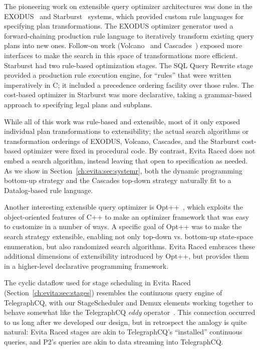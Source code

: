 The pioneering work on extensible query optimizer architectures was done in the
EXODUS~\cite{exodus} and Starburst~\cite{lohman,phh92} systems, which provided
custom rule languages for specifying plan transformations.  The EXODUS
optimizer generator used a forward-chaining production rule language to iteratively
transform existing query plans into new ones.  Follow-on work
(Volcano~\cite{volcano} and Cascades~\cite{cascades}) exposed more interfaces
to make the search in this space of transformations more efficient.  Starburst
had two rule-based optimization stages.  The SQL Query Rewrite stage provided a
production rule execution engine, for ``rules'' that were written imperatively
in C; it included a precedence ordering facility over those rules.  The
cost-based optimizer in Starburst was more declarative, taking a grammar-based
approach to specifying legal plans and subplans.

While all of this work was rule-based and extensible, most of it only exposed
individual plan transformations to extensibility; the actual search algorithms
or transformation orderings of EXODUS, Volcano, Cascades, and the Starburst
cost-based optimizer were fixed in procedural code.  By contrast, Evita Raced
does not embed a search algorithm, instead leaving that open to specification
as needed.  As we show in Section~\ref{ch:evita:sec:systemr}, both the dynamic programming
bottom-up strategy and the Cascades top-down strategy naturally fit to a
Datalog-based rule language.

Another interesting extensible query optimizer is Opt++~\cite{kabradewitt},
which exploits the object-oriented features of C++ to make an optimizer
framework that was easy to customize in a number of ways.  A specific goal of
Opt++ was to make the search strategy extensible, enabling not only top-down
vs.  bottom-up state-space enumeration, but also randomized search algorithms.
Evita Raced embraces these additional dimensions of extensibility introduced by
Opt++, but provides them in a higher-level declarative programming framework.

The cyclic dataflow used for stage scheduling in Evita Raced
(Section~\ref{ch:evita:sec:stages}) resembles the continuous query engine of
TelegraphCQ, with our StageScheduler and Demux elements working together to
behave somewhat like the TelegraphCQ {\em eddy} operator~\cite{tcq-cidr}.  This
connection occurred to us long after we developed our design, but in retrospect
the analogy is quite natural: Evita Raced stages are akin to TelegraphCQ's
``installed'' continuous queries, and P2's \OVERLOG queries are akin to data
streaming into TelegraphCQ.

